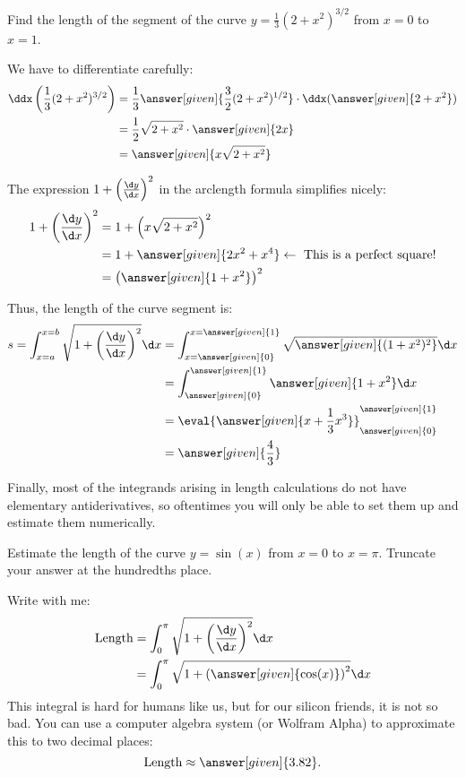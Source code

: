 \documentclass{ximera}
\begin{document}
\begin{example}
Find the length of the segment of the curve $y=\frac{1}{3}(2+x^2)^{3/2}$ from $x=0$ to $x=1$.  

\begin{explanation}
We have to differentiate carefully:
\begin{align*}
\ddx\left(\frac{1}{3}(2+x^2)^{3/2}\right) &= \frac{1}{3} \answer[given]{\frac{3}{2}(2+x^2)^{1/2}} \cdot \ddx (\answer[given]{2+x^2}) \\
&= \frac{1}{2} \sqrt{2+x^2} \cdot \answer[given]{2x} \\
&= \answer[given]{x\sqrt{2+x^2}}
\end{align*}

The expression $1+\left(\frac{\d y}{\d x}\right)^2$ in the arclength formula simplifies nicely:
\begin{align*}
1+\left(\frac{\d y}{\d x}\right)^2 &= 1+\left(x\sqrt{2+x^2}\right)^2 \\
&= 1+ \answer[given]{2x^2+x^4} \leftarrow \textrm{ This is a perfect square!} \\
&= \left(\answer[given]{1+x^2}\right)^2
\end{align*}

Thus, the length of the curve segment is:
\begin{align*}
s  = \int_{x=a}^{x=b} \sqrt{1+ \left(\frac{\d y}{\d x}\right)^2} \d x &=  \int_{x=\answer[given]{0}}^{x=\answer[given]{1}} \sqrt{\answer[given]{(1+x^2)^2} }\d x \\
&= \int_{\answer[given]{0}}^{\answer[given]{1}} \answer[given]{1+x^2} \d x \\
&= \eval{\answer[given]{x+\frac{1}{3} x^3}}_{\answer[given]{0}}^{\answer[given]{1}}\\
&= \answer[given]{\frac{4}{3}}
\end{align*}
\end{explanation}
\end{example}

Finally, most of the integrands arising in length calculations do not have elementary antiderivatives, so oftentimes you will only be able to set them up and estimate them numerically.

\begin{example}
  Estimate the length of the curve $y = \sin(x)$ from $x=0$ to $x =
  \pi$.  Truncate your answer at the hundredths place.
  \begin{explanation}
    Write with me:
    \begin{align*}
      \text{Length} &= \int_0^\pi \sqrt{1+\left( \frac{\d y}{ \d x}\right)^2} \d x\\
      &= \int_0^\pi \sqrt{1+\left(
        \answer[given]{\cos(x)}\right)^2} \d x
    \end{align*}
    This integral is hard for humans like us, but for our silicon
    friends, it is not so bad.  You can use a computer algebra system
    (or Wolfram Alpha) to approximate this to two decimal places:
    \[
    \text{Length} \approx \answer[given]{3.82}.
    \]
  \end{explanation}
\end{example}
\end{document}
